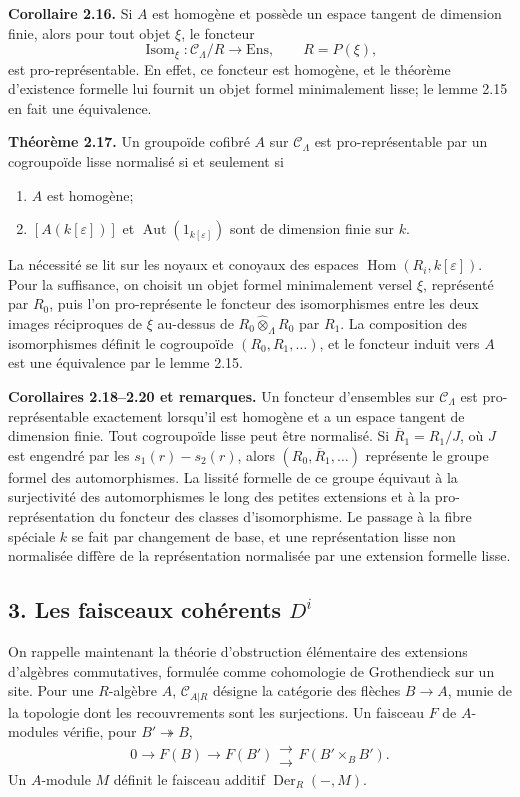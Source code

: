 \documentclass[11pt]{article}
\providecommand{\Aut}{\operatorname{Aut}}
\providecommand{\Isom}{\operatorname{Isom}}
\providecommand{\Hom}{\operatorname{Hom}}
\providecommand{\Isom}{\operatorname{Isom}}
\providecommand{\Der}{\operatorname{Der}}
\providecommand{\cC}{\mathcal C}
\begin{document}
\textbf{Corollaire 2.16.}  Si \(A\) est homogène et possède un espace tangent de dimension finie, alors pour tout objet \(\xi\), le foncteur
\[
\Isom_\xi:\cC_\Lambda/R\to\mathrm{Ens},\qquad R=P(\xi),
\]
est pro-représentable.  En effet, ce foncteur est homogène, et le théorème d'existence formelle lui fournit un objet formel minimalement lisse; le lemme 2.15 en fait une équivalence.

\textbf{Théorème 2.17.}  Un groupoïde cofibré \(A\) sur \(\cC_\Lambda\) est pro-représentable par un cogroupoïde lisse normalisé si et seulement si
\begin{enumerate}[label=\textup{(\arabic*)}]
\item \(A\) est homogène;
\item \([A(k[\varepsilon])]\) et \(\Aut(1_{k[\varepsilon]})\) sont de dimension finie sur \(k\).
\end{enumerate}
La nécessité se lit sur les noyaux et conoyaux des espaces \(\Hom(R_i,k[\varepsilon])\).  Pour la suffisance, on choisit un objet formel minimalement versel \(\xi\), représenté par \(R_0\), puis l'on pro-représente le foncteur des isomorphismes entre les deux images réciproques de \(\xi\) au-dessus de \(R_0\widehat\otimes_\Lambda R_0\) par \(R_1\).  La composition des isomorphismes définit le cogroupoïde \((R_0,R_1,\ldots)\), et le foncteur induit vers \(A\) est une équivalence par le lemme 2.15.

\textbf{Corollaires 2.18--2.20 et remarques.}  Un foncteur d'ensembles sur \(\cC_\Lambda\) est pro-représentable exactement lorsqu'il est homogène et a un espace tangent de dimension finie.  Tout cogroupoïde lisse peut être normalisé.  Si \(\overline R_1=R_1/J\), où \(J\) est engendré par les \(s_1(r)-s_2(r)\), alors \((R_0,\overline R_1,\ldots)\) représente le groupe formel des automorphismes.  La lissité formelle de ce groupe équivaut à la surjectivité des automorphismes le long des petites extensions et à la pro-représentation du foncteur des classes d'isomorphisme.  Le passage à la fibre spéciale \(k\) se fait par changement de base, et une représentation lisse non normalisée diffère de la représentation normalisée par une extension formelle lisse.

\subsection*{3. Les faisceaux cohérents \(D^i\)}

On rappelle maintenant la théorie d'obstruction élémentaire des extensions d'algèbres commutatives, formulée comme cohomologie de Grothendieck sur un site.  Pour une \(R\)-algèbre \(A\), \(\cC_{A|R}\) désigne la catégorie des flèches \(B\to A\), munie de la topologie dont les recouvrements sont les surjections.  Un faisceau \(F\) de \(A\)-modules vérifie, pour \(B'\twoheadrightarrow B\),
\[
0\to F(B)\to F(B')\mathrel{\substack{\longrightarrow\\[-.6ex]\longrightarrow}} F(B'\times_BB').
\]
Un \(A\)-module \(M\) définit le faisceau additif \(\Der_R(-,M)\).
\end{document}
